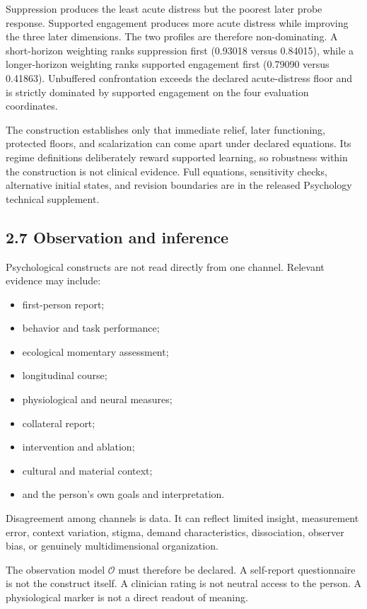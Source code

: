 \documentclass[
  11pt,
]{article}
\providecommand{\tightlist}{%
  \setlength{\itemsep}{0pt}\setlength{\parskip}{0pt}}
\begin{document}
Suppression produces the least acute distress but the poorest later
probe response. Supported engagement produces more acute distress while
improving the three later dimensions. The two profiles are therefore
non-dominating. A short-horizon weighting ranks suppression first
(0.93018 versus 0.84015), while a longer-horizon weighting ranks
supported engagement first (0.79090 versus 0.41863). Unbuffered
confrontation exceeds the declared acute-distress floor and is strictly
dominated by supported engagement on the four evaluation coordinates.

The construction establishes only that immediate relief, later
functioning, protected floors, and scalarization can come apart under
declared equations. Its regime definitions deliberately reward supported
learning, so robustness within the construction is not clinical
evidence. Full equations, sensitivity checks, alternative initial
states, and revision boundaries are in the released Psychology technical
supplement.

\subsection{2.7 Observation and
inference}\label{observation-and-inference}

Psychological constructs are not read directly from one channel.
Relevant evidence may include:

\begin{itemize}
\tightlist
\item
  first-person report;
\item
  behavior and task performance;
\item
  ecological momentary assessment;
\item
  longitudinal course;
\item
  physiological and neural measures;
\item
  collateral report;
\item
  intervention and ablation;
\item
  cultural and material context;
\item
  and the person's own goals and interpretation.
\end{itemize}

Disagreement among channels is data. It can reflect limited insight,
measurement error, context variation, stigma, demand characteristics,
dissociation, observer bias, or genuinely multidimensional organization.

The observation model \(\mathcal O\) must therefore be declared. A
self-report questionnaire is not the construct itself. A clinician
rating is not neutral access to the person. A physiological marker is
not a direct readout of meaning.
\end{document}
